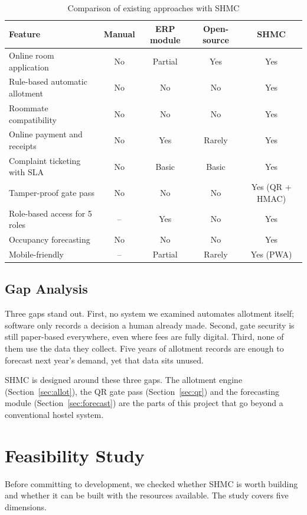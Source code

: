 \documentclass[11pt,a4paper]{report}
\begin{document}
\begin{table}[H]
\centering\small
\caption{Comparison of existing approaches with SHMC}\label{tab:compare}
\begin{tabularx}{\textwidth}{Lcccc}
\toprule
\textbf{Feature} & \textbf{Manual} & \textbf{ERP module} & \textbf{Open-source} & \textbf{SHMC}\\
\midrule
Online room application & No & Partial & Yes & Yes\\
Rule-based automatic allotment & No & No & No & Yes\\
Roommate compatibility & No & No & No & Yes\\
Online payment and receipts & No & Yes & Rarely & Yes\\
Complaint ticketing with SLA & No & Basic & Basic & Yes\\
Tamper-proof gate pass & No & No & No & Yes (QR + HMAC)\\
Role-based access for 5 roles & -- & Yes & No & Yes\\
Occupancy forecasting & No & No & No & Yes\\
Mobile-friendly & -- & Partial & Rarely & Yes (PWA)\\
\bottomrule
\end{tabularx}
\end{table}

\section{Gap Analysis}
Three gaps stand out. First, no system we examined automates allotment itself; software only records a decision a human already made. Second, gate security is still paper-based everywhere, even where fees are fully digital. Third, none of them use the data they collect. Five years of allotment records are enough to forecast next year's demand, yet that data sits unused.

SHMC is designed around these three gaps. The allotment engine (Section~\ref{sec:allot}), the QR gate pass (Section~\ref{sec:qr}) and the forecasting module (Section~\ref{sec:forecast}) are the parts of this project that go beyond a conventional hostel system.

\chapter{Feasibility Study}
Before committing to development, we checked whether SHMC is worth building and whether it can be built with the resources available. The study covers five dimensions.
\end{document}
